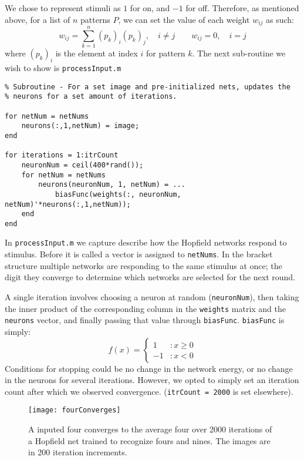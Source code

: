 \documentclass[]{article}
\theoremstyle{plain}
\theoremstyle{definition}
\begin{document}
We chose to represent stimuli as $ 1 $ for on, and $ -1 $ for off. Therefore, as mentioned above, for a list of $ n $ patterns $ P $, we can set the value of each weight $ w_{ij} $ as such:
\[ w_{ij} = \sum\limits_{k = 1}^{n}(p_{k})_i(p_{k})_j, \quad i\neq j \qquad w_{ij} = 0, \quad i=j \] where $ (p_k)_i $ is the element at index $ i $ for pattern $ k $.
\newpage
The next sub-routine we wish to show is \texttt{processInput.m}
\singlespacing
\begin{verbatim}
% Subroutine - For a set image and pre-initialized nets, updates the
% neurons for a set amount of iterations. 

for netNum = netNums
    neurons(:,1,netNum) = image;
end

for iterations = 1:itrCount
    neuronNum = ceil(400*rand());
    for netNum = netNums
        neurons(neuronNum, 1, netNum) = ...
            biasFunc(weights(:, neuronNum, netNum)'*neurons(:,1,netNum));
    end
end
\end{verbatim}
\doublespacing
\quad In \texttt{processInput.m} we capture describe how the Hopfield networks respond to stimulus. Before it is called a vector is assigned to \texttt{netNums}. In the bracket structure multiple networks are responding to the same stimulus at once; the digit they converge to determine which networks are selected for the next round. 

A single iteration involves choosing a neuron at random (\texttt{neuronNum}), then taking the inner product of the corresponding column in the \texttt{weights} matrix and the \texttt{neurons} vector, and finally passing that value through \texttt{biasFunc}. \texttt{biasFunc} is simply:
\[ f(x) = \left\{\begin{array}{cc}
1 &: x \geq 0\\
-1 &: x < 0
\end{array}\right. \]
Conditions for stopping could be no change in the network energy, or no change in the neurons for several iterations. However, we opted to simply set an iteration count after which we observed convergence. (\texttt{itrCount = 2000} is set elsewhere).

\begin{figure}[h]
\centering
\texttt{[image: fourConverges]}
\caption{A inputed four converges to the average four over 2000 iterations of a Hopfield net trained to recognize fours and nines. The images are in 200 iteration increments.}
\end{figure}

\newpage
\end{document}
